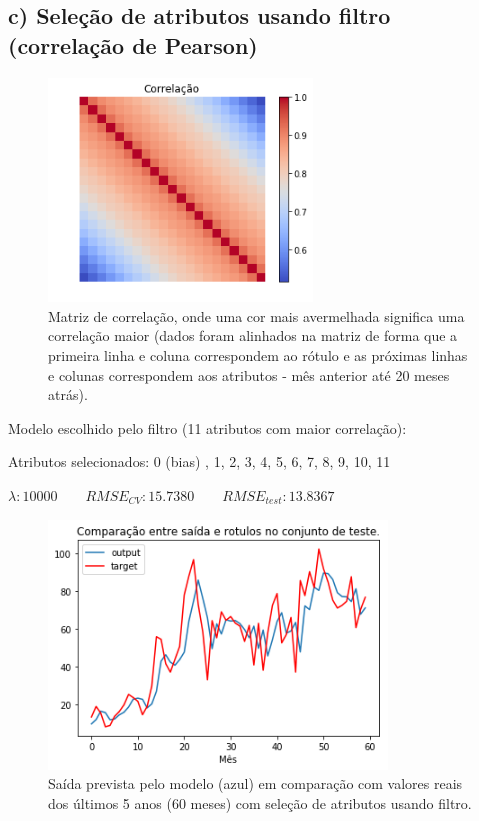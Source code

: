 \documentclass[a4paper, 12pt]{article}
\begin{document}
\subsection*{c) Seleção de atributos usando filtro (correlação de Pearson)}

\begin{figure}[h!]
    \centering
    \includegraphics[width=7cm]{images/corr.png}
    \caption{Matriz de correlação, onde uma cor mais avermelhada significa uma correlação maior (dados foram alinhados na matriz de forma que a primeira linha e coluna correspondem ao rótulo e as próximas linhas e colunas correspondem aos atributos - mês anterior até 20 meses atrás).}
\end{figure}

Modelo escolhido pelo filtro (11 atributos com maior correlação):

Atributos selecionados: 0 (bias) , 1, 2, 3, 4, 5, 6, 7, 8, 9, 10, 11

$\lambda: 10000 \quad\quad RMSE_{CV}: 15.7380 \quad\quad RMSE_{test}: 13.8367$

\begin{figure}[h!]
    \centering
  \includegraphics[width=9cm]{images/filter.png}
    \caption{Saída prevista pelo modelo (azul) em comparação com valores reais dos últimos 5 anos (60 meses) com seleção de atributos usando filtro.}
\end{figure}
\end{document}
